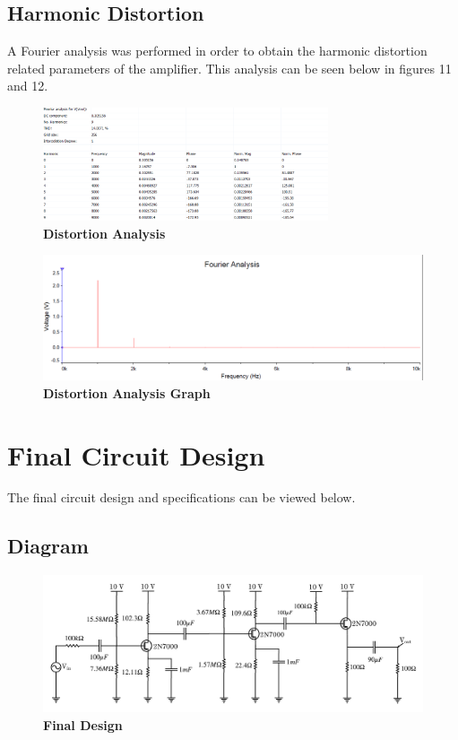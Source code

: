 \documentclass{article}
\begin{document}
\subsection{Harmonic Distortion}
A Fourier analysis was performed in order to obtain the harmonic distortion related parameters of the amplifier. This analysis can be seen below in figures 11 and 12. 
    \begin{figure}[H]
        \centerline{\includegraphics[width=0.75\textwidth]{distortion_chart}}
        \caption{\textbf{Distortion Analysis}}
    \end{figure}
    \begin{figure}[H]
        \caption{\textbf{Distortion Analysis Graph}}
        \centerline{\includegraphics[width=\textwidth]{distortion_graph}}
	\end{figure}
\section{Final Circuit Design}
The final circuit design and specifications can be viewed below.
\subsection{Diagram}
\begin{figure}[H]
        \centerline{\includegraphics[width=\textwidth]{final_design}}
        \caption{\textbf{Final Design}}
	\end{figure}
\end{document}
